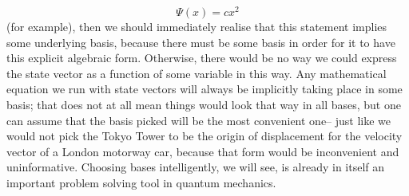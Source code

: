 $$
\Psi(x)=cx^{2}
$$
(for example), then we should immediately realise that this statement implies some underlying basis, because there must be some basis in order for it to have this explicit algebraic form. Otherwise, there would be no way we could express the state vector as a function of some variable in this way. Any mathematical equation we run with state vectors will always be implicitly taking place in some basis; that does not at all mean things would look that way in all bases, but one can assume that the basis picked will be the most convenient one-- just like we would not pick the Tokyo Tower to be the origin of displacement for the velocity vector of a London motorway car, because that form would be inconvenient and uninformative. Choosing bases intelligently, we will see, is already in itself an important problem solving tool in quantum mechanics.  
